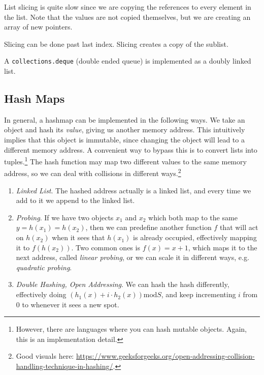   \begin{definition}[Extend]
    
  \end{definition}

  \begin{definition}[Sort]
    
  \end{definition}

  List slicing is quite slow since we are copying the references to every element in the list. Note that the values are not copied themselves, but we are creating an array of new pointers. 

  Slicing can be done past last index. Slicing creates a copy of the sublist. 

  \begin{definition}[Queues]
    A \texttt{collections.deque} (double ended queue) is implemented as a doubly linked list. 
  \end{definition}

\subsection{Hash Maps}

  In general, a hashmap can be implemented in the following ways. We take an object and hash its \textit{value}, giving us another memory address. This intuitively implies that this object is immutable, since changing the object will lead to a different memory address. A convenient way to bypass this is to convert lists into tuples.\footnote{However, there are languages where you can hash mutable objects. Again, this is an implementation detail.} The hash function may map two different values to the same memory address, so we can deal with collisions in different ways.\footnote{Good visuals here: \href{https://www.geeksforgeeks.org/open-addressing-collision-handling-technique-in-hashing/}{https://www.geeksforgeeks.org/open-addressing-collision-handling-technique-in-hashing/}.}

  \begin{enumerate}
    \item \textit{Linked List}. The hashed address actually is a linked list, and every time we add to it we append to the linked list. 
    \item \textit{Probing}. If we have two objects $x_1$ and $x_2$ which both map to the same $y = h(x_1) = h(x_2)$, then we can predefine another function $f$ that will act on $h(x_2)$ when it sees that $h(x_1)$ is already occupied, effectively mapping it to $f(h(x_2))$. Two common ones is $f(x) = x + 1$, which maps it to the next address, called \textit{linear probing}, or we can scale it in different ways, e.g. \textit{quadratic probing}. 
    \item \textit{Double Hashing, Open Addressing}. We can hash the hash differently, effectively doing $(h_1(x) + i \cdot h_2(x)) \mathrm{mod} S$, and keep incrementing $i$ from $0$ to whenever it sees a new spot. 
  \end{enumerate}

